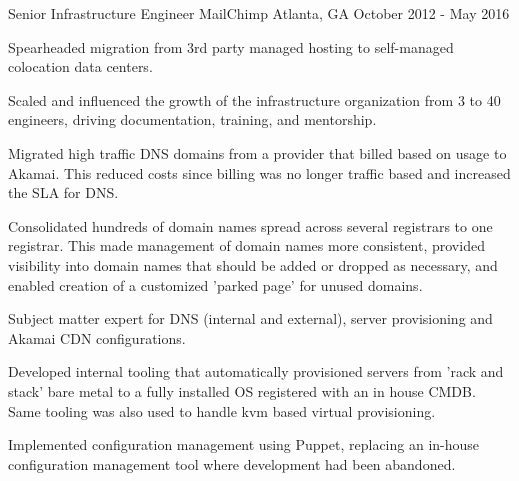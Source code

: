 \begin{cventries}
  \cventry
    {Senior Infrastructure Engineer} %
    {MailChimp} %
    {Atlanta, GA} %
    {October 2012 - May 2016} %
    {
      \begin{cvitems}
        \item {Spearheaded migration from 3rd party managed hosting to self-managed colocation data centers.}
        \item {Scaled and influenced the growth of the infrastructure organization from 3 to 40 engineers, driving documentation, training, and mentorship.}
        \item {Migrated high traffic DNS domains from a provider that billed based on usage to Akamai. This reduced costs since billing was no longer traffic based and increased the SLA for DNS.}
        \item {Consolidated hundreds of domain names spread across several registrars to one registrar. This made management of domain names more consistent, provided visibility into domain names that should be added or dropped as necessary, and enabled creation of a customized 'parked page' for unused domains.}
        \item {Subject matter expert for DNS (internal and external), server provisioning and Akamai CDN configurations.}
        \item {Developed internal tooling that automatically provisioned servers from 'rack and stack' bare metal to a fully installed OS registered with an in house CMDB. Same tooling was also used to handle kvm based virtual provisioning.}
        \item {Implemented configuration management using Puppet, replacing an in-house configuration management tool where development had been abandoned.}
      \end{cvitems}
    }
 



\end{cventries}
